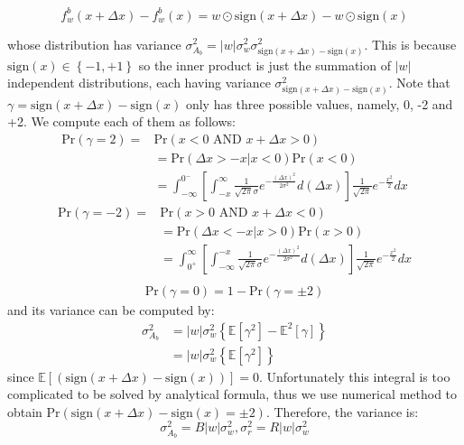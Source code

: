 \documentclass[10pt,twocolumn,letterpaper]{article}
\begin{document}
\[
    f_{w}^{b}(x+\Delta x) - f_{w}^{b}(x) = w \odot \text{sign}(x+\Delta x) - w \odot \text{sign}(x)
\]

whose distribution has variance $\sigma_{A_{b}}^{2} = |w|\sigma_{w}^{2}\sigma_{\text{sign}(x+\Delta x)-\text{sign}(x)}^{2}$. This is because $\text{sign}(x)\in\left\{ -1, +1 \right\}$ so the inner product is just the summation of $|w|$ independent distributions, each having variance $\sigma_{\text{sign}(x+\Delta x)-\text{sign}(x)}^{2}$. Note that $\gamma = \text{sign}(x+\Delta x)-\text{sign}(x)$ only has three possible values, namely, 0, -2 and +2. We compute each of them as follows:
\[
    \begin{split}
        \text{Pr}(\gamma = 2) = &\text{Pr}(x < 0 \text{ AND } x+\Delta x > 0)\\
        &= \text{Pr}(\Delta x > -x | x < 0)\text{Pr}(x < 0)\\
        &= \int_{-\infty}^{0^{-}}[\int_{-x}^{\infty}\frac{1}{\sqrt{2\pi}\sigma}e^{-\frac{(\Delta x)^{2}}{2\sigma^{2}}}d(\Delta x)]\frac{1}{\sqrt{2\pi}}e^{-\frac{x^{2}}{2}}dx
    \end{split}
\]
\[
    \begin{split}
        \text{Pr}(\gamma = -2) = &\text{Pr}(x > 0 \text{ AND } x+\Delta x < 0)\\
        &= \text{Pr}(\Delta x < -x | x > 0)\text{Pr}(x > 0)\\
        &= \int_{0^{+}}^{\infty}[\int_{-\infty}^{-x}\frac{1}{\sqrt{2\pi}\sigma}e^{-\frac{(\Delta x)^{2}}{2\sigma^{2}}}d(\Delta x)]\frac{1}{\sqrt{2\pi}}e^{-\frac{x^{2}}{2}}dx\\
    \end{split}
\]
\[
    \begin{split}
        \text{Pr}(\gamma = 0) = 1 - \text{Pr}(\gamma = \pm2)
    \end{split}
\]
and its variance can be computed by:
\[
    \begin{split}
        \sigma_{A_{b}}^{2} &= |w|\sigma_{w}^{2}\left\{\mathbb E[\gamma^{2}] - \mathbb E^{2}[\gamma]\right\}\\
        &= |w|\sigma_{w}^{2}\left\{\mathbb E[\gamma^{2}]\right\}
    \end{split}
\]
since $\mathbb E[(\text{sign}(x+\Delta x)-\text{sign}(x))] = 0$. Unfortunately this integral is too complicated to be solved by analytical formula, thus we use numerical method to obtain $\text{Pr}(\text{sign}(x+\Delta x)-\text{sign}(x) = \pm 2)$. Therefore, the variance is:
\[
    \sigma_{A_{b}}^{2} = B|w|\sigma_{w}^{2}, \sigma_{r}^{2} = R|w|\sigma_{w}^{2} 
\]
\end{document}
